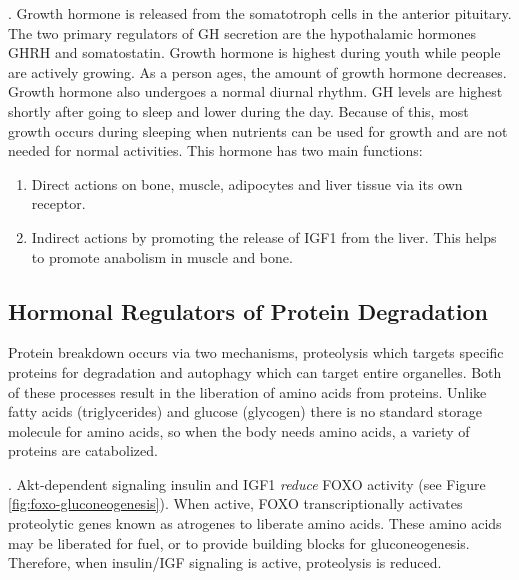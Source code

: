 \documentclass{tufte-handout}
\begin{document}
.  Growth hormone is released from the somatotroph cells in the anterior pituitary.  The two primary regulators of GH secretion are the hypothalamic hormones GHRH and somatostatin.  Growth hormone is highest during youth while people are actively growing.  As a person ages, the amount of growth hormone decreases.  Growth hormone also undergoes a normal diurnal rhythm.  GH levels are highest shortly after going to sleep and lower during the day.  Because of this, most growth occurs during sleeping when nutrients can be used for growth and are not needed for normal activities.  This hormone has two main functions:
\begin{enumerate}
\item Direct actions on bone, muscle, adipocytes and liver tissue via its own receptor.
\item Indirect actions by promoting the release of IGF1 from the liver.  This helps to promote anabolism in muscle and bone.
\end{enumerate}

\subsection{Hormonal Regulators of Protein Degradation}
Protein breakdown occurs via two mechanisms, proteolysis which targets specific proteins for degradation and autophagy which can target entire organelles.  Both of these processes result in the liberation of amino acids from proteins.  Unlike fatty acids (triglycerides) and glucose (glycogen) there is no standard storage molecule for amino acids, so when the body needs amino acids, a variety of proteins are catabolized. 

.  Akt-dependent signaling insulin and IGF1 \emph{reduce} FOXO activity (see Figure \ref{fig:foxo-gluconeogenesis}).  When active, FOXO transcriptionally activates proteolytic genes known as atrogenes to liberate amino acids.  These amino acids may be liberated for fuel, or to provide building blocks for gluconeogenesis.  Therefore, when insulin/IGF signaling is active, proteolysis is reduced. 
\end{document}
